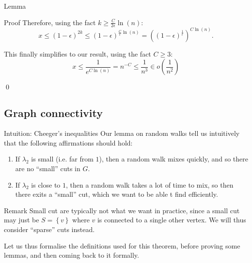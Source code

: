 \documentclass[a4paper]{article}
\begin{document}
\begin{parag}{Lemma}
\begin{subparag}{Proof}
        Therefore, using the fact $k \geq \frac{C}{2\epsilon} \ln\left(n\right)$:
        \[x \leq \left(1 - \epsilon\right)^{2k} \leq \left(1 - \epsilon\right)^{\frac{C}{\epsilon} \ln\left(n\right)} = \left(\left(1 - \epsilon\right)^{\frac{1}{\epsilon}}\right)^{C \ln\left(n\right)}.\]
        
        This finally simplifies to our result, using the fact $C \geq 3$: 
        \[x \leq \frac{1}{e^{C \ln\left(n\right)}} = n^{-C} \leq \frac{1}{n^3} \in o\left(\frac{1}{n^2}\right)\]
        
        \qed
    \end{subparag}
\end{parag}

\subsection{Graph connectivity}

\begin{parag}{Intuition: Cheeger's inequalities}
    Our lemma on random walks tell us intuitively that the following affirmations should hold:
    \begin{enumerate}
        \item If $\lambda_2$ is small (i.e. far from $1$), then a random walk mixes quickly, and so there are no ``small'' cuts in $G$.
        \item If $\lambda_2$ is close to $1$, then a random walk takes a lot of time to mix, so then there exits a ``small'' cut, which we want to be able t find efficiently.
    \end{enumerate}
    
    \begin{subparag}{Remark}
        Small cut are typically not what we want in practice, since a small cut may just be $S = \left\{v\right\}$ where $v$ is connected to a single other vertex. We will thus consider ``sparse'' cuts instead.

        Let us thus formalise the definitions used for this theorem, before proving some lemmas, and then coming back to it formally.
    \end{subparag}
\end{parag}
\end{document}
